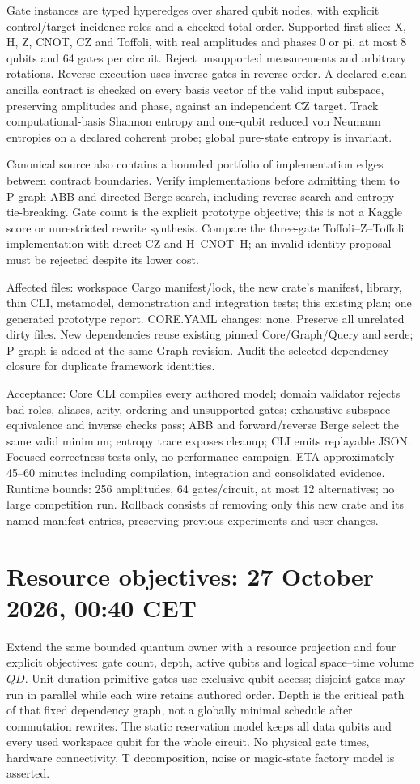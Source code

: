 \documentclass{article}
\begin{document}
Gate instances are typed hyperedges over shared qubit nodes, with explicit
control/target incidence roles and a checked total order. Supported first slice:
X, H, Z, CNOT, CZ and Toffoli, with real amplitudes and phases 0 or pi, at most
8 qubits and 64 gates per circuit. Reject unsupported measurements and arbitrary
rotations. Reverse execution uses inverse gates in reverse order. A declared
clean-ancilla contract is checked on every basis vector of the valid input
subspace, preserving amplitudes and phase, against an independent CZ target.
Track computational-basis Shannon entropy and one-qubit reduced von Neumann
entropies on a declared coherent probe; global pure-state entropy is invariant.

Canonical source also contains a bounded portfolio of implementation edges
between contract boundaries. Verify implementations before admitting them to
P-graph ABB and directed Berge search, including reverse search and entropy
tie-breaking. Gate count is the explicit prototype objective; this is not a
Kaggle score or unrestricted rewrite synthesis. Compare the three-gate
Toffoli--Z--Toffoli implementation with direct CZ and H--CNOT--H; an invalid
identity proposal must be rejected despite its lower cost.

Affected files: workspace Cargo manifest/lock, the new crate's manifest,
library, thin CLI, metamodel, demonstration and integration tests; this existing
plan; one generated prototype report. CORE.YAML changes: none. Preserve all
unrelated dirty files. New dependencies reuse existing pinned Core/Graph/Query
and serde; P-graph is added at the same Graph revision. Audit the selected
dependency closure for duplicate framework identities.

Acceptance: Core CLI compiles every authored model; domain validator rejects
bad roles, aliases, arity, ordering and unsupported gates; exhaustive subspace
equivalence and inverse checks pass; ABB and forward/reverse Berge select the
same valid minimum; entropy trace exposes cleanup; CLI emits replayable JSON.
Focused correctness tests only, no performance campaign. ETA approximately
45--60 minutes including compilation, integration and consolidated evidence.
Runtime bounds: 256 amplitudes, 64 gates/circuit, at most 12 alternatives; no
large competition run. Rollback consists of removing only this new crate and
its named manifest entries, preserving previous experiments and user changes.
\section*{Resource objectives: 27 October 2026, 00:40 CET}
Extend the same bounded quantum owner with a resource projection and four
explicit objectives: gate count, depth, active qubits and logical space--time
volume $Q D$. Unit-duration primitive gates use exclusive qubit access;
disjoint gates may run in parallel while each wire retains authored order.
Depth is the critical path of that fixed dependency graph, not a globally
minimal schedule after commutation rewrites. The static reservation model keeps
all data qubits and every used workspace qubit for the whole circuit. No physical
gate times, hardware connectivity, T decomposition, noise or magic-state factory
model is asserted.
\end{document}
